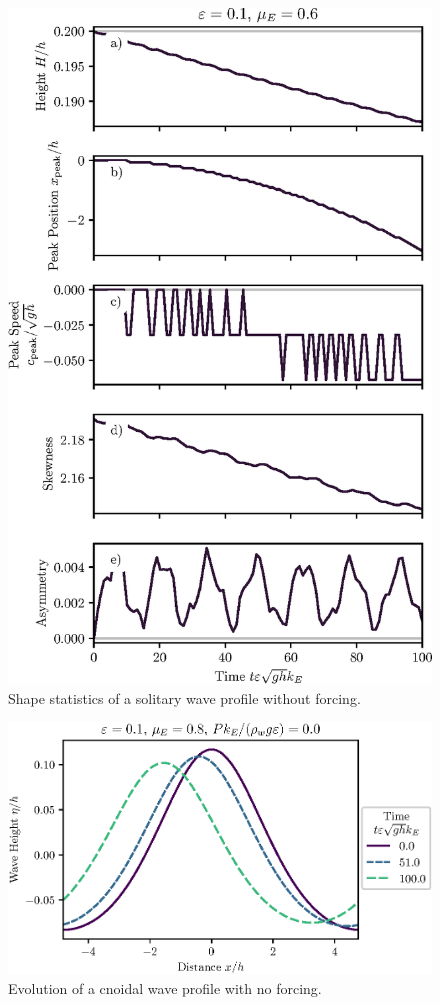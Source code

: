 \documentclass{jfm}
\begin{document}
\begin{figure}
  \centering
  \includegraphics{LongStatistics-Solitary.eps}
  \caption{
    Shape statistics of a solitary wave profile without forcing.
  }
\end{figure}

\begin{figure}
  \centering
  \includegraphics{Long-Run-Cnoidal.eps}
  \caption{
    Evolution of a cnoidal wave profile with no forcing.
  }
\end{figure}
\end{document}

